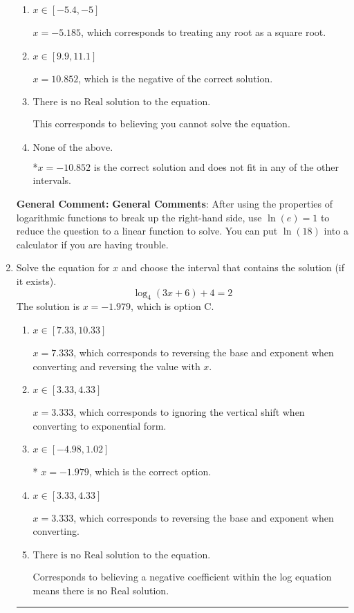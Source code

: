 \documentclass{extbook}[14pt]
\newcommand{\litem}[1]{\item #1

\rule{\textwidth}{0.4pt}}
\begin{document}
\begin{enumerate}
{\begin{enumerate}[label=\Alph*.]
$x = -2.371$, which corresponds to thinking you need to take the natural log of the left side before reducing.
\item \( x \in [-5.4, -5] \)

$x = -5.185$, which corresponds to treating any root as a square root.
\item \( x \in [9.9, 11.1] \)

$x = 10.852$, which is the negative of the correct solution.
\item \( \text{There is no Real solution to the equation.} \)

This corresponds to believing you cannot solve the equation.
\item \( \text{None of the above.} \)

*$x = -10.852$ is the correct solution and does not fit in any of the other intervals.
\end{enumerate}

\textbf{General Comment:} \textbf{General Comments}: After using the properties of logarithmic functions to break up the right-hand side, use $\ln(e) = 1$ to reduce the question to a linear function to solve. You can put $\ln(18)$ into a calculator if you are having trouble.
}
\litem{
Solve the equation for $x$ and choose the interval that contains the solution (if it exists).
\[ \log_{4}{(3x+6)}+4 = 2 \]The solution is \( x = -1.979 \), which is option C.\begin{enumerate}[label=\Alph*.]
\item \( x \in [7.33, 10.33] \)

$x = 7.333$, which corresponds to reversing the base and exponent when converting and reversing the value with $x$.
\item \( x \in [3.33, 4.33] \)

$x = 3.333$, which corresponds to ignoring the vertical shift when converting to exponential form.
\item \( x \in [-4.98, 1.02] \)

* $x = -1.979$, which is the correct option.
\item \( x \in [3.33, 4.33] \)

$x = 3.333$, which corresponds to reversing the base and exponent when converting.
\item \( \text{There is no Real solution to the equation.} \)

Corresponds to believing a negative coefficient within the log equation means there is no Real solution.
\end{enumerate}

}
\end{enumerate}
\end{document}

